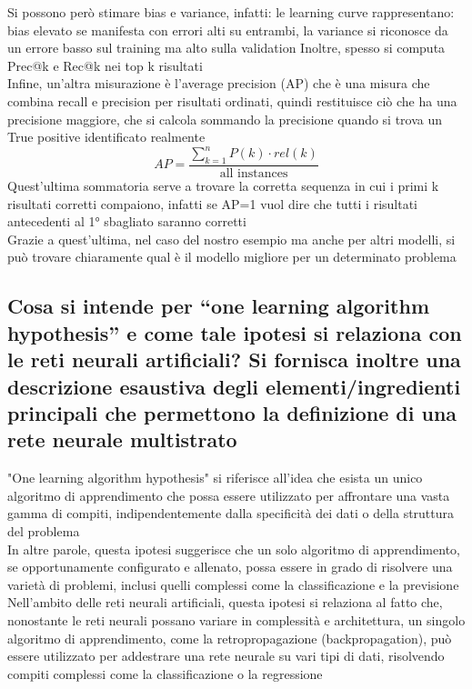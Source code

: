 \documentclass[10pt,oneside,a4paper]{article}
\begin{document}
	Si possono però stimare bias e variance, infatti:
	le learning curve rappresentano:\\
	bias elevato se manifesta con errori alti su entrambi, la variance si riconosce da un errore basso sul training ma alto sulla validation
	Inoltre, spesso si computa Prec@k e Rec@k nei top k risultati\\
	Infine, un'altra misurazione è l'average precision (AP) che è una misura che combina recall e precision per risultati ordinati, quindi restituisce ciò che ha una precisione maggiore, che si calcola sommando la precisione quando si trova un True positive identificato realmente
	\[ AP=\frac{\sum_{k=1}^{n}P(k) \cdot rel(k)}{\text{all instances}} \]
	Quest'ultima sommatoria serve a trovare la corretta sequenza in cui i primi k risultati corretti compaiono, infatti se AP=1 vuol dire che tutti i risultati antecedenti al 1° sbagliato saranno corretti\\
	Grazie a quest'ultima, nel caso del nostro esempio ma anche per altri modelli, si può trovare chiaramente qual è il modello migliore per un determinato problema
	
	
	
	
	\subsection{Cosa si intende per “one learning algorithm hypothesis” e come tale ipotesi si relaziona
		con le reti neurali artificiali? Si fornisca inoltre una descrizione esaustiva degli elementi/ingredienti
		principali che permettono la definizione di una rete neurale multistrato}
	"One learning algorithm hypothesis" si riferisce all'idea che esista un unico algoritmo di apprendimento che possa essere utilizzato per affrontare una vasta gamma di compiti, indipendentemente dalla specificità dei dati o della struttura del problema\\
	In altre parole, questa ipotesi suggerisce che un solo algoritmo di apprendimento, se opportunamente configurato e allenato, possa essere in grado di risolvere una varietà di problemi, inclusi quelli complessi come la classificazione e la previsione\\
	Nell'ambito delle reti neurali artificiali, questa ipotesi si relaziona al fatto che, nonostante le reti neurali possano variare in complessità e architettura, un singolo algoritmo di apprendimento, come la retropropagazione (backpropagation), può essere utilizzato per addestrare una rete neurale su vari tipi di dati, risolvendo compiti complessi come la classificazione o la regressione
	
\end{document}
